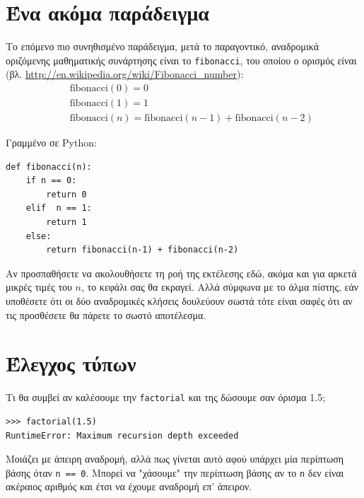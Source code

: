 \documentclass[10pt]{book}
\begin{document}
\section{Ένα ακόμα παράδειγμα}
\label{one.more.example}

Το επόμενο πιο συνηθισμένο παράδειγμα, μετά το παραγοντικό, αναδρομικά οριζόμενης μαθηματικής συνάρτησης είναι το {\tt fibonacci}, του οποίου ο ορισμός είναι (βλ. \url{http://en.wikipedia.org/wiki/Fibonacci_number}):
%
\begin{eqnarray*}
&& \mathrm{fibonacci}(0) = 0 \\
&& \mathrm{fibonacci}(1) = 1 \\
&& \mathrm{fibonacci}(n) = \mathrm{fibonacci}(n-1) + \mathrm{fibonacci}(n-2)
\end{eqnarray*}
%

Γραμμένο σε Python:

\begin{verbatim}
def fibonacci(n):
    if n == 0:
        return 0
    elif  n == 1:
        return 1
    else:
        return fibonacci(n-1) + fibonacci(n-2)
\end{verbatim}
%

Αν προσπαθήσετε να ακολουθήσετε τη ροή της εκτέλεσης εδώ, ακόμα και
για αρκετά μικρές τιμές του  $n$,  το κεφάλι σας θα εκραγεί.
Αλλά σύμφωνα με το άλμα πίστης, εάν υποθέσετε ότι οι δύο αναδρομικές
κλήσεις δουλεύουν σωστά τότε είναι σαφές ότι αν τις προσθέσετε θα
πάρετε το σωστό αποτέλεσμα.


\section{Έλεγχος τύπων}
\label{guardian}

Τι θα συμβεί αν καλέσουμε την {\tt factorial} και της δώσουμε σαν
όρισμα 1.5;

\begin{verbatim}
>>> factorial(1.5)
RuntimeError: Maximum recursion depth exceeded
\end{verbatim}
%

Μοιάζει με άπειρη αναδρομή, αλλά πως γίνεται αυτό αφού υπάρχει μία
περίπτωση βάσης όταν {\tt n == 0}. Μπορεί να "χάσουμε" την περίπτωση βάσης αν το {\tt n} δεν είναι ακέραιος αριθμός και έτσι να έχουμε αναδρομή επ' άπειρον.
\end{document}
